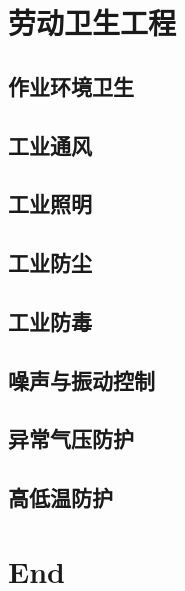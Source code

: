 \documentclass[UTF8]{../ApplicationUniverse}
\begin{document}
\chapter{劳动卫生工程}
\section{作业环境卫生}
\section{工业通风}
\section{工业照明}
\section{工业防尘}
\section{工业防毒}
\section{噪声与振动控制}
\section{异常气压防护}
\section{高低温防护}



\chapter{End}
\end{document}
